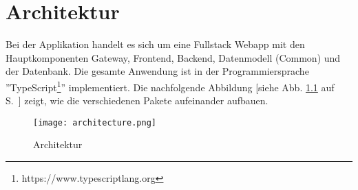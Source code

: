 \chapter{Architektur}

Bei der Applikation handelt es sich um eine Fullstack Webapp mit den Hauptkomponenten Gateway, Frontend, Backend, Datenmodell (Common) und der Datenbank. Die gesamte Anwendung ist in der Programmiersprache ''TypeScript\footnote{https://www.typescriptlang.org}'' implementiert. Die nachfolgende Abbildung [siehe Abb. \ref{fig: architektur} auf S.~\pageref{fig: architektur}] zeigt, wie die verschiedenen Pakete aufeinander aufbauen.
\begin{figure}[h]
    \centering
    \texttt{[image: architecture.png]}
    \caption{Architektur}
    \label{fig: architektur}
\end{figure}
